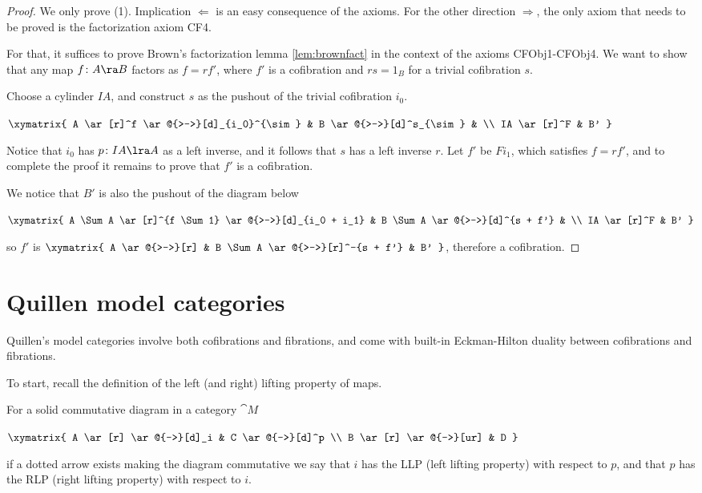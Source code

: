 \begin{proof}
We only prove (1). Implication $\Leftarrow$ is an easy consequence of the axioms. For the other direction $\Rightarrow$, the only axiom that needs to be proved is the factorization axiom CF4.

For that, it suffices to prove Brown's factorization lemma \ref{lem:brownfact} in the context of the axioms CFObj1-CFObj4. We want to show that any map $f \colon A \ra B$ factors as $f = rf'$, where $f'$ is a cofibration and $rs = 1_B$ for a trivial cofibration $s$.

Choose a cylinder $IA$, and construct $s$ as the pushout of the trivial cofibration $i_0$.

\begin{center}
$ \xymatrix {
        A \ar[r]^f \ar@{>->}[d]_{i_0}^{\sim} &
	B \ar@{>->}[d]^s_{\sim} & \\
	IA \ar[r]^F &
	B'
	}$
\end{center}

Notice that $i_0$ has $p \colon IA \lra A$ as a left inverse, and it follows that $s$ has a left inverse $r$. Let $f'$ be $Fi_1$, which satisfies $f = rf'$, and to complete the proof it remains to prove that $f'$ is a cofibration. 

We notice that $B'$ is also the pushout of the diagram below
\begin{center}
$ \xymatrix {
        A \Sum A \ar[r]^{f \Sum 1} \ar@{>->}[d]_{i_0 + i_1} &
	B \Sum A \ar@{>->}[d]^{s + f'} & \\
	IA \ar[r]^F &
	B'
	}$
\end{center}
so $f'$ is $ \xymatrix { A \ar@{>->}[r] & B \Sum A \ar@{>->}[r]^-{s + f'} & B' } $, therefore a cofibration.
\end{proof}

\section{Quillen model categories}
Quillen's model categories involve both cofibrations and fibrations, and come with built-in Eckman-Hilton duality between cofibrations and fibrations. 

To start, recall the definition of the left (and right) lifting property of maps.

\begin{defn}
\label{defn:llp}
For a solid commutative diagram in a category ${\cat M}$
\begin{center}
$ \xymatrix {
	A \ar[r] \ar@{->}[d]_i &
	C \ar@{->}[d]^p \\
	B \ar[r] \ar@{-->}[ur] &
	D
	}$
\end{center}
if a dotted arrow exists making the diagram commutative we say that $i$ has the LLP (left lifting property) with respect to $p$, and that $p$ has the RLP (right lifting property) with respect to $i$.
\end{defn}

